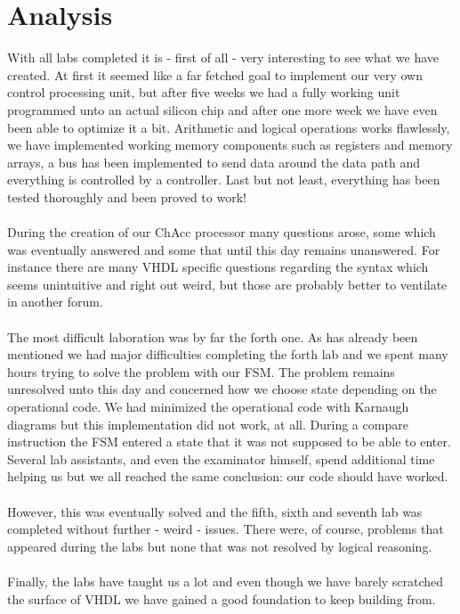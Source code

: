 \documentclass[a4paper,11pt]{article}
\begin{document}
\section{Analysis}
With all labs completed it is - first of all - very interesting to see what 
we have created. At first it seemed like a far fetched goal to implement our 
very own control processing unit, but after five weeks we had a fully 
working unit programmed unto an actual silicon chip and after one more week 
we have even been able to optimize it a bit. Arithmetic and logical 
operations works flawlessly, we have implemented working memory components 
such as registers and memory arrays, a bus has been implemented to send data 
around the data path and everything is controlled by a controller. Last but 
not least, everything has been tested thoroughly and been proved to work!\\\\
\noindent
During the creation of our ChAcc processor many questions arose, some which 
was eventually answered and some that until this day remains unanswered. For 
instance there are many VHDL specific questions regarding the syntax which 
seems unintuitive and right out weird, but those are probably better to 
ventilate in another forum.\\\\
\noindent
The most difficult laboration was by far the forth one. As has already been 
mentioned we had major difficulties completing the forth lab and we spent 
many hours trying to solve the problem with our FSM. The problem remains 
unresolved unto this day and concerned how we choose state depending on the 
operational code. We had minimized the operational code with Karnaugh diagrams 
but this implementation did not work, at all. During a compare instruction 
the FSM entered a state that it was not supposed to be able to enter. Several 
lab assistants, and even the examinator himself, spend additional time helping 
us but we all reached the same conclusion: our code should have worked.\\\\
\noindent
However, this was eventually solved and the fifth, sixth and seventh lab 
was completed without further - weird - issues. There were, of course, problems 
that appeared during the labs but none that was not resolved by logical 
reasoning.\\\\
\noindent
Finally, the labs have taught us a lot and even though we have barely 
scratched the surface of VHDL we have gained a good foundation to keep 
building from.\\\\
\end{document}
